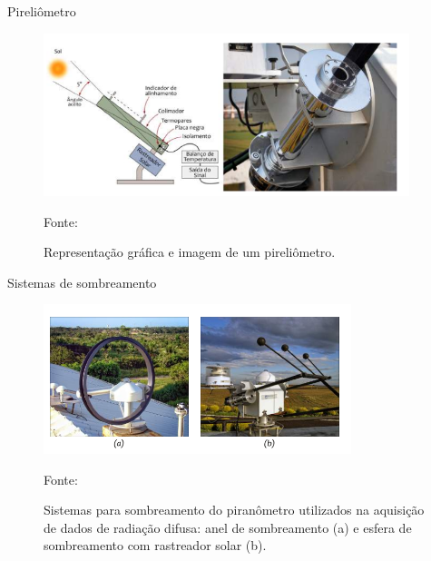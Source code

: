 \documentclass{beamer}
\begin{document}
\begin{frame}{Pireliômetro}

\begin{figure}[H]
    \centering
    \includegraphics[width=0.95\textwidth]{./Figuras/pirheliometro.png}
    \caption{Representação gráfica e imagem de um pireliômetro.}{Fonte: \cite{kippzonen}}
   \label{fig:pirheliometro}
\end{figure}

\end{frame}



\begin{frame}{Sistemas de sombreamento}

\begin{figure}[H]
    \centering
    \includegraphics[width=0.8\textwidth]{./Figuras/sis_sombra.png}
    \caption{Sistemas para sombreamento do piranômetro utilizados na aquisição de dados de radiação difusa: anel de sombreamento (a) e esfera de sombreamento com rastreador solar (b).}{Fonte: \cite{atlas2017}}
   \label{fig:sis_sombra}
\end{figure}

\end{frame}

\end{document}

